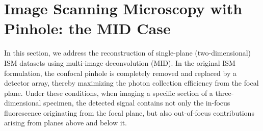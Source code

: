 \documentclass[letterpaper]{article}
\begin{document}
\section{Image Scanning Microscopy with Pinhole: the MID Case} \label{sec1}
In this section, we address the reconstruction of single-plane (two-dimensional) ISM datasets using multi-image deconvolution (MID). In the original ISM formulation, the confocal pinhole is completely removed and replaced by a detector array, thereby maximizing the photon collection efficiency from the focal plane. Under these conditions, when imaging a specific section of a three-dimensional specimen, the detected signal contains not only the in-focus fluorescence originating from the focal plane, but also out-of-focus contributions arising from planes above and below it.
\end{document}
